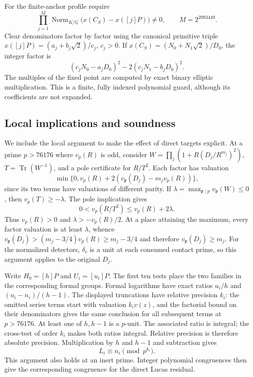 \documentclass[11pt,a4paper]{article}
\theoremstyle{definition}
\theoremstyle{remark}
\begin{document}
For the finite-anchor profile require
\[
 \prod_{j=1}^{M}\operatorname{Norm}_{K/\mathbb Q}
          \bigl(x(C_S)-x([j]P)\bigr)\ne0,
                  \qquad M=2^{2093449}.
\]
Clear denominators factor by factor using the canonical primitive triple
$x([j]P)=(a_j+b_j\sqrt2)/c_j$, $c_j>0$.
If $x(C_S)=(N_0+N_1\sqrt2)/D_0$, the integer factor is
\[
                  (c_jN_0-a_jD_0)^2-2(c_jN_1-b_jD_0)^2.
\]
The multiples of the fixed point are computed by exact binary elliptic
multiplication.  This is a finite, fully indexed polynomial guard,
although its coefficients are not expanded.

\subsection{Local implications and soundness}

We include the local argument to make the effect of direct targets
explicit.  At a prime $p>76176$ where $v_p(R)$ is odd, consider
$W=\prod_j(1+R(D_j/R^{m_j})^2)$, $T=\operatorname{Tr}(W^{-1})$,
and a pole certificate for $R/T^2$.  Each factor has valuation
\[
 \min\{0,v_p(R)+2(v_{\mathfrak p}(D_j)-m_jv_p(R))\},
\]
since its two terms have valuations of different parity.  If
$\lambda=\max_{\mathfrak p\mid p}v_{\mathfrak p}(W)\le0$, then
$v_p(T)\ge-\lambda$.  The pole implication gives
\[
                 0<v_p(R/T^2)\le v_p(R)+2\lambda.
\]
Thus $v_p(R)>0$ and $\lambda>-v_p(R)/2$.  At a place attaining
the maximum, every factor valuation is at least $\lambda$, whence
$v_{\mathfrak p}(D_j)>(m_j-3/4)v_p(R)\ge m_j-3/4$ and therefore
$v_{\mathfrak p}(D_j)\ge m_j$.
For the normalized detectors, $\delta_r$ is a unit at each consumed
contact prime, so this argument applies to the original $D_j$.

Write $H_0=[h]P$ and $U_i=[u_i]P$.  The first ten tests place the
two families in the corresponding formal groups.  Formal logarithms
have exact ratios $u_i/h$ and $(u_i-n_i)/(h-1)$.
The displayed truncations have relative precision $k_i$: the omitted
series terms start with valuation $k_i v(z)$, and the factorial bound
on their denominators gives the same conclusion for all subsequent
terms at $p>76176$.  At least one of $h,h-1$ is a $p$-unit.
The associated ratio is integral; the cross-test of order $k_i$
makes both ratios integral.  Relative precision is therefore absolute
precision.  Multiplication by $h$ and $h-1$ and subtraction gives
\[
                  L_i\equiv n_i\pmod{p^{k_i}}.
\]
This argument also holds at an inert prime.  Integer polynomial
congruences then give the corresponding congruence for the direct
Lucas residual.
\end{document}
